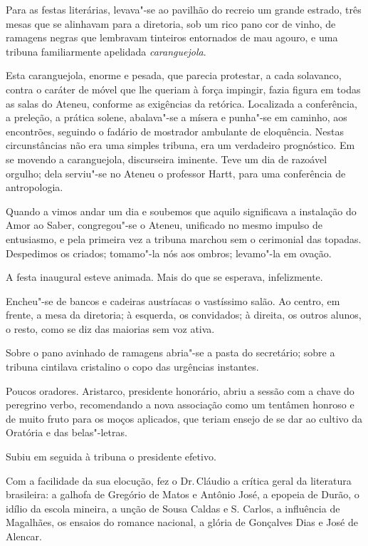 Para as festas literárias, levava"-se ao pavilhão do recreio um grande
estrado, três mesas que se alinhavam para a diretoria, sob um rico pano
cor de vinho, de ramagens negras que lembravam tinteiros entornados de
mau agouro, e uma tribuna familiarmente apelidada \textit{caranguejola}. 

Esta caranguejola, enorme e pesada, que parecia protestar, a cada solavanco,
contra o caráter de móvel que lhe queriam à força impingir, fazia
figura em todas as salas do Ateneu, conforme as exigências da retórica.
Localizada a conferência, a preleção, a prática solene, abalava"-se a
mísera e punha"-se em caminho, aos encontrões, seguindo o fadário de
mostrador ambulante de eloquência. Nestas circunstâncias não era uma
simples tribuna, era um verdadeiro prognóstico. Em se movendo a
caranguejola, discurseira iminente. Teve um dia de razoável orgulho;
dela serviu"-se no Ateneu o professor Hartt, para uma conferência de
antropologia. 

Quando a vimos andar um dia e soubemos que aquilo
significava a instalação do Amor ao Saber, congregou"-se o Ateneu,
unificado no mesmo impulso de entusiasmo, e pela primeira vez a tribuna
marchou sem o cerimonial das topadas. Despedimos os criados;
tomamo"-la nós aos ombros; levamo"-la em ovação. 

A festa inaugural
esteve animada. Mais do que se esperava, infelizmente. 

Encheu"-se de
bancos e cadeiras austríacas o vastíssimo salão. Ao centro, em frente,
a mesa da diretoria; à esquerda, os convidados; à direita, os outros
alunos, o resto, como se diz das maiorias sem voz ativa. 

Sobre o pano
avinhado de ramagens abria"-se a pasta do secretário; sobre a tribuna
cintilava cristalino o copo das urgências instantes. 

Poucos oradores.
Aristarco, presidente honorário, abriu a sessão com a chave do
peregrino verbo, recomendando a nova associação como um tentâmen
honroso e de muito fruto para os moços aplicados, que teriam ensejo de
se dar ao cultivo da Oratória e das belas"-letras. 

Subiu em seguida à
tribuna o presidente efetivo. 

Com a facilidade da sua elocução, fez o
Dr.\,Cláudio a crítica geral da literatura brasileira: a galhofa de
Gregório de Matos e Antônio José, a epopeia de Durão, o idílio da
escola mineira, a unção de Sousa Caldas e S. Carlos, a influência de
Magalhães, os ensaios do romance nacional, a glória de Gonçalves Dias e
José de Alencar. 

